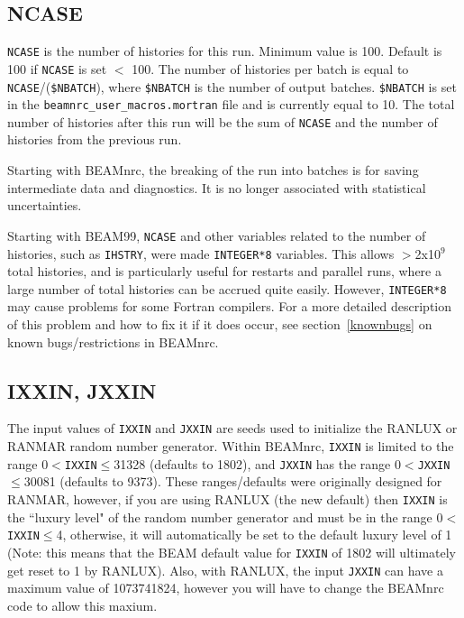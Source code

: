 \documentclass[12pt,twoside]{article}
\begin{document}
\subsection{NCASE}
\label{ncasesect}
\verb+NCASE+ is the number of histories for this run.  Minimum
value is 100.  Default is 100 if \verb+NCASE+ is set $<$ 100.  The number of
histories per batch is equal to \verb+NCASE+/({\tt \$NBATCH}), where
{\tt \$NBATCH} is the number of output batches.   {\tt \$NBATCH} is
set in the {\tt beamnrc\_user\_macros.mortran} file and is currently
equal to 10.
The total number of histories after this run will be
the sum of \verb+NCASE+ and the number of histories from the previous run.

Starting with BEAMnrc, the breaking of the run into batches is for saving
intermediate data and diagnostics. It is no longer associated with
statistical uncertainties.

Starting with BEAM99, {\tt NCASE} and other variables related to the
number of histories,
such as {\tt IHSTRY}, were made {\tt INTEGER*8} variables.  This allows
$>$2x10$^9$ total histories, and is particularly useful for restarts and
parallel runs, where a large number of total histories can be accrued quite
easily.  However, {\tt INTEGER*8} may cause problems for some Fortran compilers.
For a more detailed description of this problem and how to fix it if it does
occur, see section~\ref{knownbugs} on known bugs/restrictions in BEAMnrc.

\subsection{IXXIN, JXXIN}
\label{rngsect}

The input values of \verb+IXXIN+ and \verb+JXXIN+
are seeds used to initialize the RANLUX\cite{La94,Ja94} or
RANMAR\cite{MZ91,Ma90a}
random number generator.  Within BEAMnrc, {\tt IXXIN} is limited
to the range 0$<${\tt IXXIN}$\leq$31328 (defaults to 1802), and {\tt JXXIN} has
the range 0$<${\tt JXXIN}$\leq$30081 (defaults to 9373).
These ranges/defaults were originally designed for RANMAR, however, if
you are using RANLUX (the new default) then {\tt IXXIN} is the ``luxury level"
of the random number generator and must be in the range
0$<${\tt IXXIN}$\leq$4, otherwise, it will automatically be set to the
default luxury level of 1 (Note: this means that the BEAM default value
for {\tt IXXIN} of 1802 will ultimately get reset to 1 by RANLUX).  Also,
with RANLUX, the input {\tt JXXIN} can have a maximum value of 1073741824,
however you will have to change the BEAMnrc code to allow this maxium.
\end{document}
